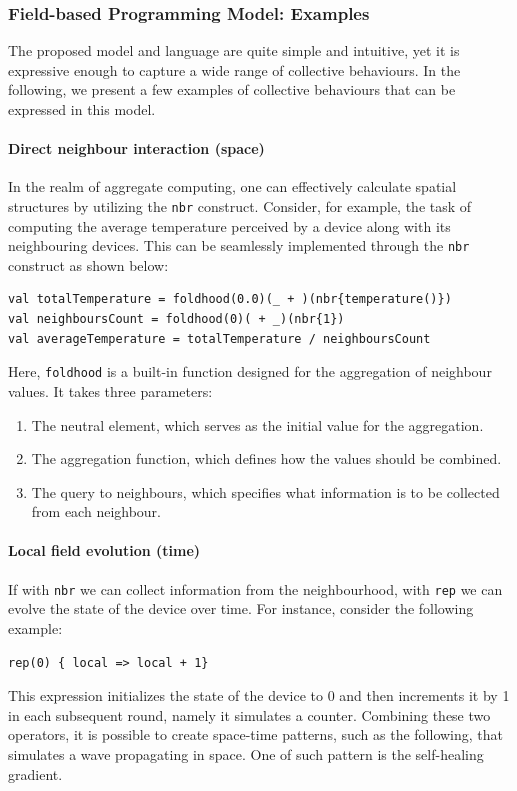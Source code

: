 \subsubsection{Field-based Programming Model: Examples}
\label{sec:field-calculus-foundational-behaviour}
The proposed model and language are quite simple and intuitive, 
 yet it is expressive enough to capture a wide range of collective behaviours.
In the following, we present a few examples of collective behaviours that can be expressed in this model.
\paragraph*{Direct neighbour interaction (space)}
In the realm of aggregate computing, 
 one can effectively calculate spatial structures by utilizing the \texttt{nbr} construct. 
 Consider, for example, the task of computing the average temperature perceived by a device along with its neighbouring devices. 
 This can be seamlessly implemented through the \texttt{nbr} construct as shown below:
\begin{lstlisting}[language=scafi]
val totalTemperature = foldhood(0.0)(_ + )(nbr{temperature()})
val neighboursCount = foldhood(0)( + _)(nbr{1})
val averageTemperature = totalTemperature / neighboursCount
\end{lstlisting}
Here, \texttt{foldhood} is a built-in function designed for the aggregation of neighbour values. 
It takes three parameters:
\begin{enumerate}
\item The neutral element, which serves as the initial value for the aggregation.
\item The aggregation function, which defines how the values should be combined.
\item The query to neighbours, which specifies what information is to be collected from each neighbour.
\end{enumerate} 
\paragraph*{Local field evolution (time)}
If with \texttt{nbr} we can collect information from the neighbourhood, 
 with \texttt{rep} we can evolve the state of the device over time. 
 For instance, consider the following example:
\begin{lstlisting}[language=scafi]
rep(0) { local => local + 1}
\end{lstlisting}
This expression initializes the state of the device to 0 and then increments it by 1 in each subsequent round, namely it simulates a counter.
Combining these two operators, it is possible to create space-time patterns, 
 such as the following, that simulates a wave propagating in space.
 One of such pattern is the self-healing gradient.
